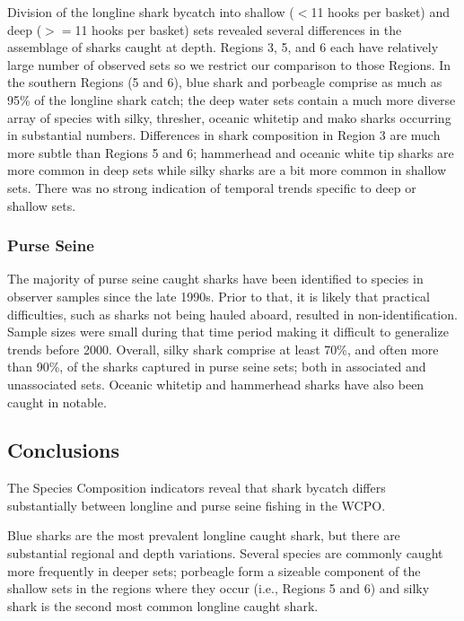 \documentclass[12pt]{SCreport}
\begin{document}
Division of the longline shark bycatch into shallow ($<$11 hooks per basket) and deep ($>=$11 hooks per basket) sets revealed several differences in the assemblage of sharks caught at depth.  Regions 3, 5, and 6 each have relatively large number of observed sets so we restrict our comparison to those Regions.  In the southern Regions (5 and 6), blue shark and porbeagle comprise as much as 95\% of the longline shark catch; the deep water sets contain a much more diverse array of species with silky, thresher, oceanic whitetip and mako sharks occurring in substantial numbers.  Differences in shark composition in Region 3 are much more subtle than Regions 5 and 6; hammerhead and oceanic white tip sharks are more common in deep sets while silky sharks are a bit more common in shallow sets. There was no strong indication of temporal trends specific to deep or shallow sets.

  
 \subsubsection{Purse Seine} 
The majority of purse seine caught sharks have been identified to species in observer samples since the late 1990s.  Prior to that, it is likely that practical difficulties, such as sharks not being hauled aboard, resulted in non-identification.  Sample sizes were small during that time period making it difficult to generalize trends before 2000.  Overall, silky shark comprise at least 70\%, and often more than 90\%, of the sharks captured in purse seine sets; both in associated and unassociated sets.  Oceanic whitetip and hammerhead sharks have also been caught in notable.

 
 \subsection{Conclusions}

The Species Composition indicators reveal that shark bycatch differs substantially between longline and purse seine fishing in the WCPO.  

Blue sharks are the most prevalent longline caught shark, but there are substantial regional and depth variations.  Several species are commonly caught more frequently in deeper sets; porbeagle form a sizeable component of the shallow sets in the regions where they occur (i.e., Regions 5 and 6) and silky shark is the second most common longline caught shark.
\end{document}
